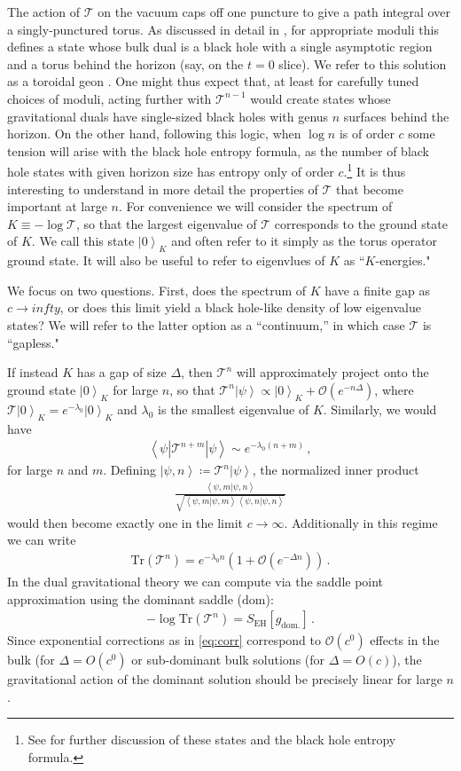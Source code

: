 \documentclass[letterpaper,12pt]{article}
\def\DM#1{{\color{red}{ [#1]}}}
\newcommand{\ban}[1]{\begin{align}#1\end{align}}
\newcommand{\corr}[1]{\left< #1\right>}
\newcommand{\Tr}{\text{Tr}}
\newcommand{\ket}[1]{\left| #1\right>}
\begin{document}
The action of $\mathcal T$ on the vacuum caps off one puncture to give a path integral over a singly-punctured torus.  As discussed in detail in \cite{Maxfield3D}, for appropriate moduli this defines a state whose bulk dual is a black hole with a single asymptotic region and a torus behind the horizon (say, on the $t=0$ slice).  We refer to this solution as a toroidal geon \cite{Friedman:1993ty,Louko:1998dj,Louko:1998hc}.  \DM{Can you add a figure showing the $t=0$ surface?.  Please use the term toroidal geon in the caption.} One might thus expect that, at least for carefully tuned choices of moduli,  acting further with $\mathcal T^{n-1}$ would create states whose gravitational duals have single-sized black holes with genus $n$ surfaces behind the horizon.   On the other hand, following this logic, when $\log n$ is of order $c$ some tension will arise with the black hole entropy formula, as the number of black hole states with given horizon size has entropy only of order $c$.\footnote{See \cite{Maloney, Kim} for further discussion of these states and the black hole entropy formula.} It is thus interesting to understand in more detail the properties of $\mathcal T$ that become important at large $n$.  For convenience we will consider the spectrum of $K \equiv - \log \mathcal T$, so that the largest eigenvalue of $\mathcal T$ corresponds to the ground state of $K$. We call this state $\ket 0_K$ and often refer to it simply as the torus operator ground state.  It will also be useful to refer to eigenvlues of $K$ as ``$K$-energies."

We focus on two questions. First, does the spectrum of $K$ have a finite gap as $c\to infty$, or does this limit yield a black hole-like density of low eigenvalue states? We will refer to the latter option as a ``continuum,'' in which case $\mathcal T$ is ``gapless."

If instead $K$ has a gap of size $\Delta$, then $\mathcal T^n$ will approximately project onto the ground state $\ket 0_K$ for large $n$, so that $\mathcal T^n\ket \psi \propto \ket 0_K + \mathcal O(e^{-n\Delta})$, where $\mathcal T \ket 0_K = e^{-\lambda_0} \ket 0_K$ and $\lambda_0$ is the smallest eigenvalue of $K$. Similarly, we would have
\ban{
\corr {\psi| \mathcal T^{n+m} |\psi} \sim e^{-\lambda_0 (n+m)} \, ,
}
for large $n$ and $m$. Defining $\ket{\psi,n} \coloneqq \mathcal T^n \ket \psi$, the normalized inner product
\ban{
	\frac{\corr{\psi,m|\psi,n}}{\sqrt{\corr{\psi,m|\psi,m}\corr{\psi,n|\psi,n}}} \label{eq:innerprod}
	}
would then become exactly one in the limit $c\to\infty$. Additionally in this regime we can write
\ban{
\label{eq:corr}
\Tr(\mathcal T^n) = e^{-\lambda_0 n}\left(1+\mathcal O(e^{-\Delta n})\right)\, .	
}
In the dual gravitational theory we can compute via the saddle point approximation using the dominant saddle ($\text{dom}$):
\ban{
-\log \Tr(\mathcal T^n)=S_\text{EH}[g_\text{dom.}]\, .
}
Since exponential corrections as in \eqref{eq:corr} correspond to $\mathcal O(c^0)$ effects in the bulk (for $\Delta = O(c^0)$ or sub-dominant bulk solutions (for $\Delta = O(c)$), the gravitational action of the dominant solution should be precisely linear for large $n$.
\end{document}
